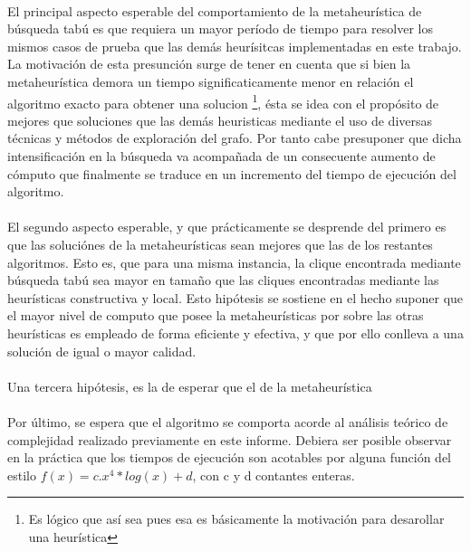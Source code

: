 \paragraph{}
El principal aspecto esperable del comportamiento de la metaheurística de búsqueda tabú es que requiera un mayor período de tiempo para resolver los mismos casos de prueba que las demás heurísitcas implementadas en este trabajo. La motivación de esta presunción surge de tener en cuenta que si bien la metaheurística demora un tiempo significaticamente menor en relación el algoritmo exacto para obtener una solucion \footnote{Es lógico que así sea pues esa es básicamente la motivación para desarollar una heurística}, ésta se idea con el propósito de mejores que soluciones que las demás heuristicas mediante el uso de diversas técnicas y métodos de exploración del grafo. Por tanto cabe presuponer que dicha intensificación en la búsqueda va acompañada de un consecuente aumento de cómputo que finalmente se traduce en un incremento del tiempo de ejecución del algoritmo.

\paragraph{}
El segundo aspecto esperable, y que prácticamente se desprende del primero es que las soluciónes de la metaheurísticas sean mejores que las de los restantes algoritmos. Esto es, que para una misma instancia, la clique encontrada mediante búsqueda tabú sea mayor en tamaño que las cliques encontradas mediante las heurísticas constructiva y local. Esto hipótesis se sostiene en el hecho suponer que el mayor nivel de computo que posee la metaheurísticas por sobre las otras heurísticas es empleado de forma eficiente y efectiva, y que por ello conlleva a una solución de igual o mayor calidad.

\paragraph{}
Una tercera hipótesis, es la de esperar que el  de la metaheurística 

\paragraph{}
Por último, se espera que el algoritmo se comporta acorde al análisis teórico de complejidad realizado previamente en este informe. Debiera ser posible observar en la práctica que los tiempos de ejecución son acotables por alguna función del estilo $f(x) = c.x^4 * log(x) + d$, con c y d contantes enteras.

